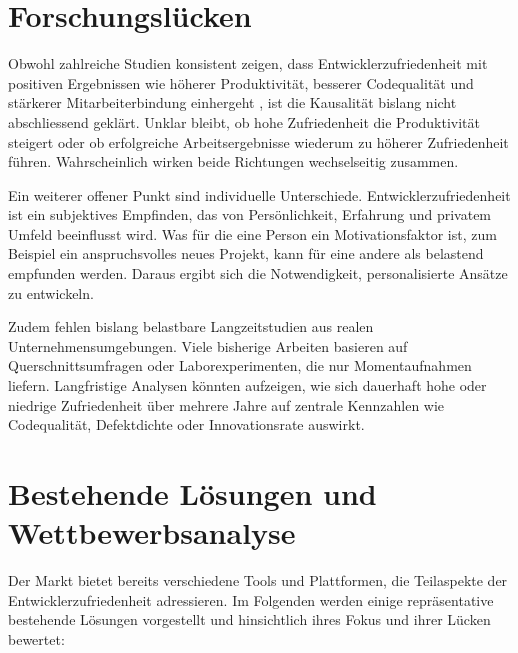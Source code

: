\documentclass[12pt,a4paper]{report}
\begin{document}

\section{Forschungslücken}

Obwohl zahlreiche Studien konsistent zeigen, dass Entwicklerzufriedenheit mit positiven Ergebnissen wie höherer Produktivität,
besserer Codequalität und stärkerer Mitarbeiterbindung einhergeht \cite{graziotin_what_2018, sadowksi_happiness_2019}, ist die
Kausalität bislang nicht abschliessend geklärt. Unklar bleibt, ob hohe Zufriedenheit die Produktivität steigert oder ob
erfolgreiche Arbeitsergebnisse wiederum zu höherer Zufriedenheit führen. Wahrscheinlich wirken beide Richtungen wechselseitig
zusammen.

Ein weiterer offener Punkt sind individuelle Unterschiede. Entwicklerzufriedenheit ist ein subjektives Empfinden, das von
Persönlichkeit, Erfahrung und privatem Umfeld beeinflusst wird. Was für die eine Person ein Motivationsfaktor ist, zum Beispiel 
ein anspruchsvolles neues Projekt, kann für eine andere als belastend empfunden werden. Daraus ergibt sich die Notwendigkeit,
personalisierte Ansätze zu entwickeln.

Zudem fehlen bislang belastbare Langzeitstudien aus realen Unternehmensumgebungen. Viele bisherige Arbeiten basieren auf
Querschnittsumfragen oder Laborexperimenten, die nur Momentaufnahmen liefern. Langfristige Analysen könnten aufzeigen, wie sich
dauerhaft hohe oder niedrige Zufriedenheit über mehrere Jahre auf zentrale Kennzahlen wie Codequalität, Defektdichte oder
Innovationsrate auswirkt. 

\section{Bestehende Lösungen und Wettbewerbsanalyse}

Der Markt bietet bereits verschiedene Tools und Plattformen, die Teilaspekte der Entwicklerzufriedenheit adressieren. Im Folgenden
werden einige repräsentative bestehende Lösungen vorgestellt und hinsichtlich ihres Fokus und ihrer Lücken bewertet:
\end{document}
